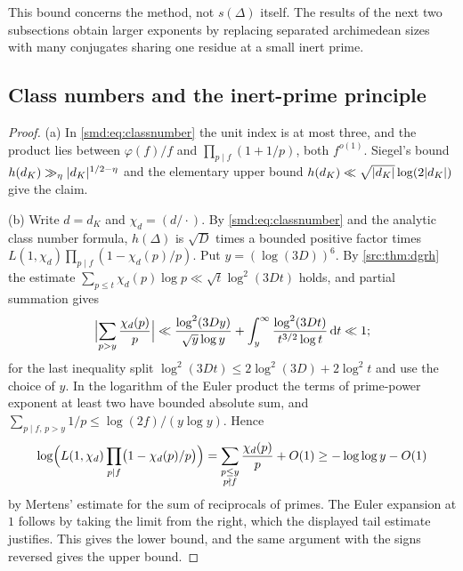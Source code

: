 This bound concerns the method, not $s(\Delta)$ itself. The results of the next two
subsections obtain larger exponents by replacing separated archimedean sizes with many
conjugates sharing one residue at a small inert prime.

\subsection{Class numbers and the inert-prime principle}\label{smd:sec:principle}
{\raggedright{}}


\begin{proof}
(a) In \eqref{smd:eq:classnumber} the unit index is at most three, and the product lies
between $\varphi(f)/f$ and $\prod_{p\mid f}(1+1/p)$, both $f^{o(1)}$. Siegel's bound
$h(d_K)\gg_\eta\lvert d_K\rvert^{1/2-\eta}$ \cite{Siegel1935Classenzahl} and the elementary upper
bound $h(d_K)\ll\sqrt{\lvert d_K\rvert}\log(2\lvert d_K\rvert)$ give the claim.

(b) Write $d=d_K$ and $\chi_d=(d/\cdot)$. By \eqref{smd:eq:classnumber} and the analytic
class number formula, $h(\Delta)$ is $\sqrt D$ times a bounded positive factor times
$L(1,\chi_d)\prod_{p\mid f}(1-\chi_d(p)/p)$. Put $y=(\log(3D))^6$. By
\cref{src:thm:dgrh} the estimate
$\sum_{p\le t}\chi_d(p)\log p\ll\sqrt t\log^2(3Dt)$ holds, and partial summation gives
\[
 \Bigl|\sum_{p>y}\frac{\chi_d(p)}p\Bigr|
 \ll\frac{\log^2(3Dy)}{\sqrt y\log y}
 +\int_y^\infty\frac{\log^2(3Dt)}{t^{3/2}\log t}\,\mathrm{d} t\ll1 ;
\]
for the last inequality split $\log^2(3Dt)\le2\log^2(3D)+2\log^2t$ and use the choice of
$y$. In the logarithm of the Euler product the terms of prime-power exponent at least two
have bounded absolute sum, and $\sum_{p\mid f,\,p>y}1/p\le\log(2f)/(y\log y)$. Hence
\[
 \log\Bigl(L(1,\chi_d)\prod_{p\mid f}\bigl(1-\chi_d(p)/p\bigr)\Bigr)
 =\sum_{\substack{p\le y\\p\nmid f}}\frac{\chi_d(p)}p+O(1)
 \ge-\log\log y-O(1)
\]
by Mertens' estimate for the sum of reciprocals of primes. The Euler expansion at $1$
follows by taking the limit from the right, which the displayed tail estimate justifies.
This gives the lower bound, and the same argument with the signs reversed gives the upper
bound.
\end{proof}

